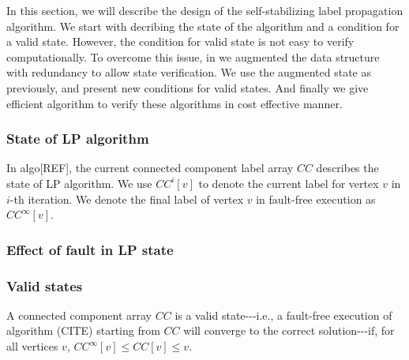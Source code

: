 In this section, we will describe the design of the self-stabilizing
label propagation algorithm. We start with decribing the state of
the algorithm and a condition for a valid state. However, the condition
for valid state is not easy to verify computationally. To overcome
this issue, in we augmented the data structure with redundancy to
allow state verification. We use the augmented state as previously,
and present new conditions for valid states. And finally we give efficient
algorithm to verify these algorithms in cost effective manner.



\subsubsection*{State of LP algorithm}

In algo{[}REF{]}, the current connected component label array $CC$
describes the state of LP algorithm. We use $CC^{i}[v]$ to denote
the current label for vertex $v$ in $i$-th iteration. We denote
the final label of vertex $v$ in fault-free execution as $CC^{\infty}[v]$. 

\subsubsection*{Effect of fault in LP state}

\subsubsection*{Valid states}
\begin{thm}
A connected component array $CC$ is a valid state-{}-{}-i.e., a fault-free
execution of algorithm (CITE) starting from $CC$ will converge to
the correct solution-{}-{}-if, for all vertices $v$, $CC^{\infty}[v]\leq CC[v]\leq v$.
\end{thm}

